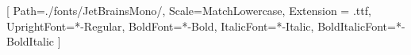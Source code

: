 \usepackage[outputdir=build/]{minted}

\usepackage{fontspec}
\setmonofont{JetBrainsMono}[
  Path=./fonts/JetBrainsMono/,
  Scale=MatchLowercase,
  Extension = .ttf,
  UprightFont=*-Regular,
  BoldFont=*-Bold,
  ItalicFont=*-Italic,
  BoldItalicFont=*-BoldItalic
]
